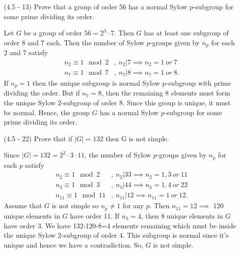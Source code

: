 \documentclass[12pt]{article}
\begin{document}
\begin{enumerate}
\item[(4.5 - 13)] Prove that a group of order 56 has
    a normal Sylow $p$-subgroup for
    some prime dividing its order.
\begin{mybox}

    Let $G$ be a group of order $56=2^3\cdot 7$.
    Then $G$ has at least one subgroup of order
    8 and 7 each. Then the number of
    Sylow $p$-groups given by $n_p$ for
    each 2 and 7 satisfy
    \begin{align*}
        n_2\equiv 1\mod{2}&,\ n_2|7
        \implies n_2=1\ or\ 7\\
        n_{7}\equiv 1\mod{7}&,\ n_{7}|8
        \implies n_{7}=1\ or\ 8.
    \end{align*}
    If $n_p=1$ then the unique subgroup is normal
    Sylow p-subgroup with prime dividing the order.
    But if $n_7=8$, then the remaining 8 elements
    must form the unique Sylow 2-subgroup of order 8.
    Since this group is unique, it must be normal.
    Hence, the group $G$ has a normal Sylow
    $p$-subgroup for some prime dividing its order.
\end{mybox}

\item[(4.5 - 22)] Prove that if $|G| = 132$ then G is
    not simple.
\begin{mybox}
    
    Since
    $|G| = 132=2^2\cdot3\cdot 11$, the number of
    Sylow
    $p$-groups given by $n_p$ for each $p$ satisfy
    \begin{align*}
        n_2\equiv 1\mod{2}&,\ n_2|33
        \implies n_2=1,3\ or\ 11\\
        n_3\equiv 1\mod{3}&,\ n_3|44
        \implies n_3=1,4\ or\ 22\\
        n_{11}\equiv 1\mod{11}&,\ n_{11}|12
        \implies n_{11}=1\ or\ 12.
    \end{align*}
    Assume that $G$ is not simple so $n_p\neq 1$
    for any $p$. Then $n_{11}=12\implies$ 120 
    unique elements
    in $G$ have order 11. If $n_3=4$, then 8 unique
    elements in $G$ have order 3. We have 132-120-8=4
    elements remaining which must be inside the unique
    Sylow 2-subgroup of order 4. This subgroup is
    normal since it's unique and hence we have a
    contradiction. So, $G$ is not simple.
\end{mybox}

\end{enumerate}
\end{document}
